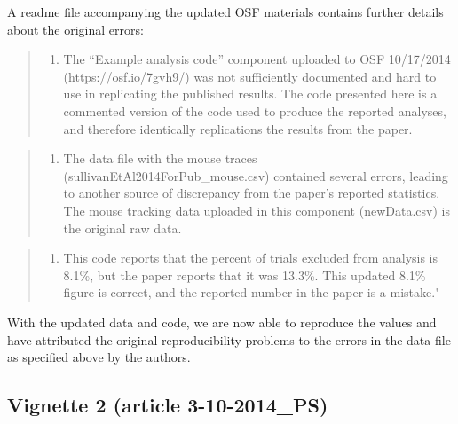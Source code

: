 \documentclass[english,,man,floatsintext]{apa6}
\providecommand{\tightlist}{%
  \setlength{\itemsep}{0pt}\setlength{\parskip}{0pt}}
\begin{document}
\begin{appendix}
A readme file accompanying the updated OSF materials contains further
details about the original errors:

\begin{quote}
\begin{enumerate}
\def\labelenumi{\arabic{enumi})}
\tightlist
\item
The ``Example analysis code'' component uploaded to OSF 10/17/2014
(https://osf.io/7gvh9/) was not sufficiently documented and hard to
use in replicating the published results. The code presented here is a
commented version of the code used to produce the reported analyses,
and therefore identically replications the results from the paper.
\end{enumerate}
\end{quote}

\begin{quote}
\begin{enumerate}
\def\labelenumi{\arabic{enumi})}
\setcounter{enumi}{1}
\tightlist
\item
The data file with the mouse traces
(sullivanEtAl2014ForPub\_mouse.csv) contained several errors, leading
to another source of discrepancy from the paper's reported statistics.
The mouse tracking data uploaded in this component (newData.csv) is
the original raw data.
\end{enumerate}
\end{quote}

\begin{quote}
\begin{enumerate}
\def\labelenumi{\arabic{enumi})}
\setcounter{enumi}{2}
\tightlist
\item
This code reports that the percent of trials excluded from analysis is
8.1\%, but the paper reports that it was 13.3\%. This updated 8.1\%
figure is correct, and the reported number in the paper is a mistake."
\end{enumerate}
\end{quote}

With the updated data and code, we are now able to reproduce the values
and have attributed the original reproducibility problems to the errors
in the data file as specified above by the authors.

\hypertarget{vignette-2-article-3-10-2014_ps}{%
\subsection{Vignette 2 (article
3-10-2014\_PS)}\label{vignette-2-article-3-10-2014_ps}}


\end{appendix}
\end{document}
